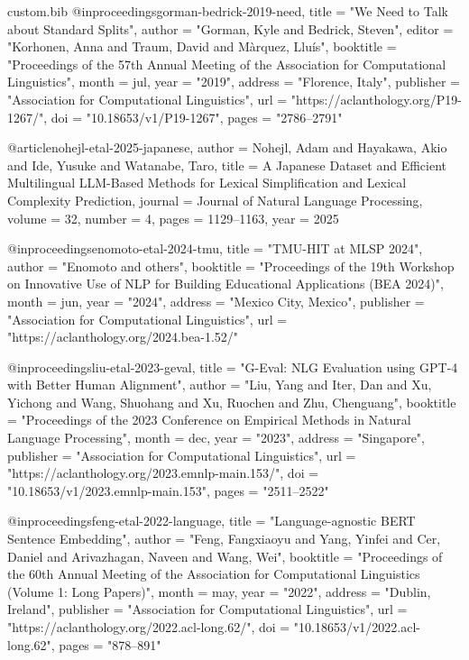\begin{filecontents*}[overwrite]{custom.bib}
@inproceedings{gorman-bedrick-2019-need,
    title = "We Need to Talk about Standard Splits",
    author = "Gorman, Kyle  and
      Bedrick, Steven",
    editor = "Korhonen, Anna  and
      Traum, David  and
      M{\`a}rquez, Llu{\'i}s",
    booktitle = "Proceedings of the 57th Annual Meeting of the Association for Computational Linguistics",
    month = jul,
    year = "2019",
    address = "Florence, Italy",
    publisher = "Association for Computational Linguistics",
    url = "https://aclanthology.org/P19-1267/",
    doi = "10.18653/v1/P19-1267",
    pages = "2786--2791"
}


@article{nohejl-etal-2025-japanese,
    author  = {Nohejl, Adam and Hayakawa, Akio and Ide, Yusuke and Watanabe, Taro},
    title   = {A {J}apanese Dataset and Efficient Multilingual {LLM}-Based Methods for Lexical Simplification and Lexical Complexity Prediction},
    journal = {Journal of Natural Language Processing},
    volume  = {32},
    number  = {4},
    pages   = {1129--1163},
    year    = {2025}
}

@inproceedings{enomoto-etal-2024-tmu,
    title     = "{TMU}-{HIT} at {MLSP} 2024",
    author    = "Enomoto and others",
    booktitle = "Proceedings of the 19th Workshop on Innovative Use of NLP for Building Educational Applications (BEA 2024)",
    month     = jun,
    year      = "2024",
    address   = "Mexico City, Mexico",
    publisher = "Association for Computational Linguistics",
    url       = "https://aclanthology.org/2024.bea-1.52/"
}

@inproceedings{liu-etal-2023-geval,
    title     = "{G}-{E}val: {NLG} Evaluation using {GPT}-4 with Better Human Alignment",
    author    = "Liu, Yang  and
      Iter, Dan  and
      Xu, Yichong  and
      Wang, Shuohang  and
      Xu, Ruochen  and
      Zhu, Chenguang",
    booktitle = "Proceedings of the 2023 Conference on Empirical Methods in Natural Language Processing",
    month     = dec,
    year      = "2023",
    address   = "Singapore",
    publisher = "Association for Computational Linguistics",
    url       = "https://aclanthology.org/2023.emnlp-main.153/",
    doi       = "10.18653/v1/2023.emnlp-main.153",
    pages     = "2511--2522"
}

@inproceedings{feng-etal-2022-language,
    title     = "Language-agnostic {BERT} Sentence Embedding",
    author    = "Feng, Fangxiaoyu  and
      Yang, Yinfei  and
      Cer, Daniel  and
      Arivazhagan, Naveen  and
      Wang, Wei",
    booktitle = "Proceedings of the 60th Annual Meeting of the Association for Computational Linguistics (Volume 1: Long Papers)",
    month     = may,
    year      = "2022",
    address   = "Dublin, Ireland",
    publisher = "Association for Computational Linguistics",
    url       = "https://aclanthology.org/2022.acl-long.62/",
    doi       = "10.18653/v1/2022.acl-long.62",
    pages     = "878--891"
}


\end{filecontents*}
